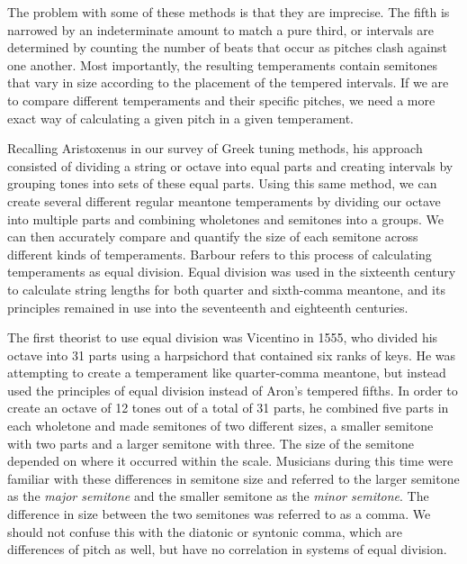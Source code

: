 The problem with some of these methods is that they are imprecise. The fifth is narrowed by an indeterminate amount to
match a pure third, or intervals are determined by counting the number of beats that occur as pitches clash against one
another. Most importantly, the resulting temperaments contain semitones that vary in size according to the placement of
the tempered intervals. If we are to compare different temperaments and their specific pitches, we need a more exact way
of calculating a given pitch in a given temperament.

Recalling Aristoxenus in our survey of Greek tuning methods, his approach consisted of dividing a string or octave into
equal parts and creating intervals by grouping tones into sets of these equal parts. Using this same method, we can
create several different regular meantone temperaments by dividing our octave into multiple parts and combining
wholetones and semitones into a groups. We can then accurately compare and quantify the size of each semitone across
different kinds of temperaments. Barbour refers to this process of calculating temperaments as equal division. Equal
division was used in the sixteenth century to calculate string lengths for both quarter and sixth-comma meantone, and
its principles remained in use into the seventeenth and eighteenth centuries.

The first theorist to use equal division was Vicentino in 1555, who divided his octave into 31 parts using a harpsichord
that contained six ranks of keys. He was attempting to create a temperament like quarter-comma meantone, but instead
used the principles of equal division instead of Aron's tempered fifths. In order to create an octave of 12 tones out of
a total of 31 parts, he combined five parts in each wholetone and made semitones of two different sizes, a smaller
semitone with two parts and a larger semitone with three. The size of the semitone depended on where it occurred within
the scale. Musicians during this time were familiar with these differences in semitone size and referred to the larger
semitone as the \textit{major semitone} and the smaller semitone as the \textit{minor semitone}. The difference in size
between the two semitones was referred to as a comma. We should not confuse this with the diatonic or syntonic comma,
which are differences of pitch as well, but have no correlation in systems of equal division.


